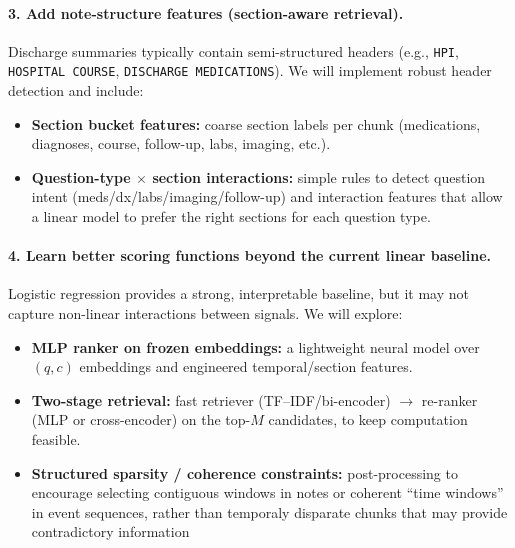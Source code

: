 \paragraph{3. Add note-structure features (section-aware retrieval).}
Discharge summaries typically contain semi-structured headers (e.g., \texttt{HPI}, \texttt{HOSPITAL COURSE}, \texttt{DISCHARGE MEDICATIONS}). We will implement robust header detection and include:
\begin{itemize}
    \item \textbf{Section bucket features:} coarse section labels per chunk (medications, diagnoses, course, follow-up, labs, imaging, etc.).
    \item \textbf{Question-type $\times$ section interactions:} simple rules to detect question intent (meds/dx/labs/imaging/follow-up) and interaction features that allow a linear model to prefer the right sections for each question type.
\end{itemize}

\paragraph{4. Learn better scoring functions beyond the current linear baseline.}
Logistic regression provides a strong, interpretable baseline, but it may not capture non-linear interactions between signals. We will explore:
\begin{itemize}
    \item \textbf{MLP ranker on frozen embeddings:} a lightweight neural model over $(q, c)$ embeddings and engineered temporal/section features.
    \item \textbf{Two-stage retrieval:} fast retriever (TF--IDF/bi-encoder) $\rightarrow$ re-ranker (MLP or cross-encoder) on the top-$M$ candidates, to keep computation feasible.
    \item \textbf{Structured sparsity / coherence constraints:} post-processing to encourage selecting contiguous windows in notes or coherent ``time windows'' in event sequences, rather than temporaly disparate chunks that may provide contradictory information
\end{itemize}

